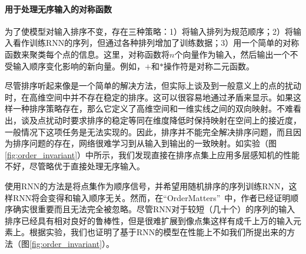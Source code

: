 % 
% 
% 
% 

\paragraph{用于处理无序输入的对称函数}
为了使模型对输入排序不变，存在三种策略：1）将输入排列为规范顺序；2）将输入看作训练RNN的序列，但通过各种排列增加了训练数据；3）用一个简单的对称函数来聚类每个点的信息。这里，对称函数将$n$个向量作为输入，然后输出一个不受输入顺序变化影响的新向量。例如，$+$和$*$操作符是对称二元函数。 

尽管排序听起来像是一个简单的解决方法，但实际上谈及到一般意义上的点的扰动时，在高维空间中并不存在稳定的排序。这可以很容易地通过矛盾来显示。如果这样一种排序策略存在，那么它定义了高维空间和一维实线之间的双向映射。不难看出，谈及点扰动时要求排序的稳定等同在维度降低时保持映射在空间上的接近度，一般情况下这项任务是无法实现的。因此，排序并不能完全解决排序问题，而且因为排序问题的存在，网络很难学习到从输入到输出的一致映射。如实验（图\ref{fig:order_invariant}）中所示，我们发现直接在排序点集上应用多层感知机的性能不好，尽管略优于直接处理无序输入。

使用RNN的方法是将点集作为顺序信号，并希望用随机排序的序列训练RNN，这样RNN将会变得和输入顺序无关。然而，在``OrderMatters''~\cite{vinyals2015order}中，作者已经证明顺序确实很重要而且无法完全被忽略。尽管RNN对于较短（几十个）的序列的输入排序已经具有相对良好的鲁棒性，但是很难扩展到像点集这样有成千上万的输入元素上。根据实验，我们也证明了基于RNN的模型在性能上不如我们所提出来的方法（图\ref{fig:order_invariant}）。

